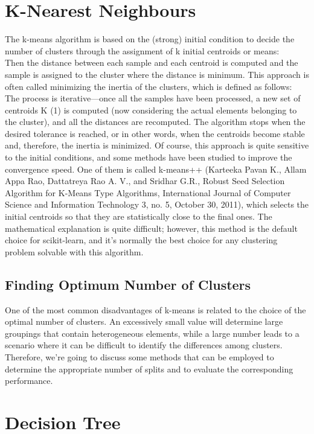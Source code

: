 \documentclass[12pt]{article}
\begin{document}
\section{K-Nearest Neighbours}
The k-means algorithm is based on the (strong) initial condition to decide the number of
clusters through the assignment of k initial centroids or means:
\\
Then the distance between each sample and each centroid is computed and the sample is
assigned to the cluster where the distance is minimum. This approach is often called
minimizing the inertia of the clusters, which is defined as follows:
\\
The process is iterative—once all the samples have been processed, a new set of centroids
K (1) is computed (now considering the actual elements belonging to the cluster), and all the
distances are recomputed. The algorithm stops when the desired tolerance is reached, or in
other words, when the centroids become stable and, therefore, the inertia is minimized.
Of course, this approach is quite sensitive to the initial conditions, and some methods have
been studied to improve the convergence speed. One of them is called k-means++ (Karteeka
Pavan K., Allam Appa Rao, Dattatreya Rao A. V., and Sridhar G.R., Robust Seed Selection
Algorithm for K-Means Type Algorithms, International Journal of Computer Science and
Information Technology 3, no. 5, October 30, 2011), which selects the initial centroids so that
they are statistically close to the final ones. The mathematical explanation is quite difficult;
however, this method is the default choice for scikit-learn, and it's normally the best choice
for any clustering problem solvable with this algorithm.
\subsection{Finding Optimum Number of Clusters}
One of the most common disadvantages of k-means is related to the choice of the optimal
number of clusters. An excessively small value will determine large groupings that contain
heterogeneous elements, while a large number leads to a scenario where it can be difficult
to identify the differences among clusters. Therefore, we're going to discuss some methods
that can be employed to determine the appropriate number of splits and to evaluate the
corresponding performance.

\newpage
\section{Decision Tree}
\end{document}
